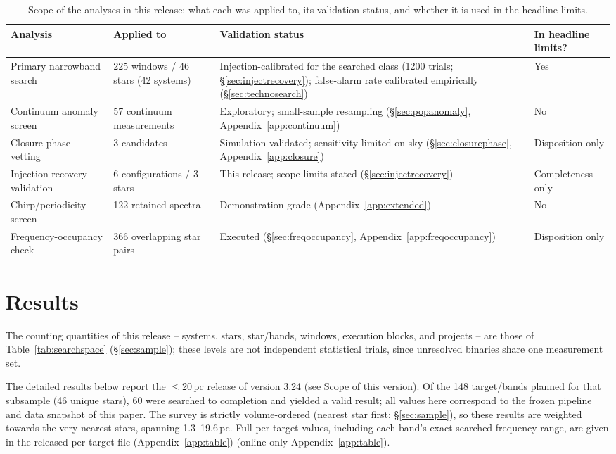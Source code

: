 \documentclass{openjournal}
\begin{document}
\begin{table}
\centering
\small
\caption{Scope of the analyses in this release: what each was applied
to, its validation status, and whether it is used in the headline
limits.}
\label{tab:supp}
\begin{tabular}{@{}p{}p{}p{}p{}@{}}
\toprule
Analysis & Applied to & Validation status & In headline limits? \\
\midrule
Primary narrowband search & 225 windows / 46 stars (42 systems) &
Injection-calibrated for the searched class (1200 trials;
\S\ref{sec:injectrecovery}); false-alarm rate calibrated empirically
(\S\ref{sec:technosearch}) & Yes \\
Continuum anomaly screen & 57 continuum measurements &
Exploratory; small-sample resampling (\S\ref{sec:popanomaly},
Appendix~\ref{app:continuum}) & No \\
Closure-phase vetting & 3 candidates & Simulation-validated;
sensitivity-limited on sky (\S\ref{sec:closurephase},
Appendix~\ref{app:closure}) & Disposition only \\
Injection-recovery validation & 6 configurations / 3 stars &
This release; scope limits stated (\S\ref{sec:injectrecovery}) &
Completeness only \\
Chirp/periodicity screen & 122 retained spectra & Demonstration-grade
(Appendix~\ref{app:extended}) & No \\
Frequency-occupancy check & 366 overlapping star pairs & Executed
(\S\ref{sec:freqoccupancy}, Appendix~\ref{app:freqoccupancy}) &
Disposition only \\
\bottomrule
\end{tabular}
\end{table}

\section{Results}
\label{sec:results}

The counting quantities of this release -- systems, stars,
star/bands, windows, execution blocks, and projects -- are those of
Table~\ref{tab:searchspace} (\S\ref{sec:sample}); these levels are
not independent statistical trials, since unresolved binaries share
one measurement set.

The detailed results below report the $\le$20\,pc release of version
3.24 (see Scope of this version). Of the 148 target/bands planned for
that subsample (46 unique stars), 60 were searched to completion and
yielded a valid result; all values here correspond to the frozen
pipeline and data snapshot of this paper. The survey is strictly
volume-ordered (nearest star first; \S\ref{sec:sample}), so these
results are weighted towards the very nearest stars, spanning
1.3--19.6\,pc. Full per-target values, including each band's exact
searched frequency range, are given in the released per-target file (Appendix~\ref{app:table})
(online-only Appendix~\ref{app:table}).
\end{document}
